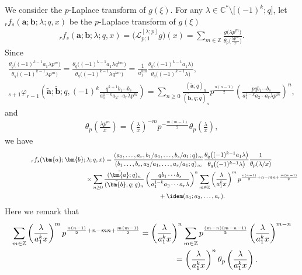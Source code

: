 We consider the $p$-Laplace transform of $g(\xi)$. For any $\lambda\in\mathbb{C}^*\setminus\big[(-1)^k;q\big]$, let ${}_rf_s(\bm{a};\bm{b};\lambda;q,x)$ be the $p$-Laplace transform of $g(\xi)$
\begin{gather*}
{}_rf_s(\bm{a};\bm{b};\lambda;q,x)=\big(\mathcal{L}_{p;1}^{[\lambda;p]}g\big)(x)=\sum_{m\in\mathbb{Z}}\frac{g\big(\lambda p^m\big)}{\theta_p\big(\frac{\lambda p^m}{x}\big)}.
\end{gather*}
Since
\begin{gather*}
\frac{\theta_q\big((-1)^{k-1}a_1\lambda p^m\big)}{\theta_q\big((-1)^{k-1}\lambda p^m\big)}=\frac{\theta_q\big((-1)^{k-1}a_1\lambda q^{km}\big)}{\theta_q\big((-1)^{k-1}\lambda q^{km}\big)}=\frac{1}{a_1^{km}}\frac{\theta_q\big((-1)^{k-1}a_1\lambda\big)}{\theta_q\big((-1)^{k-1}\lambda\big)},
\\
{}_{s+1}\varphi_{r-1}\left(\tilde{\bm{a}};\tilde{\bm{b}};q,(-1)^k\frac{q^{k+1}b_1\cdots b_s}{a_1^{1-k}a_2\cdots a_r\lambda p^m}\right)=\sum_{n\ge0}\frac{(\tilde{\bm{a}};q)_n}{(\tilde{\bm{b}},q;q)_n}p^{\frac{n(n-1)}{2}}\left(\frac{pqb_1\cdots b_s}{a_1^{1-k}a_2\cdots a_r\lambda p^m}\right)^n,
\end{gather*}
and
\begin{gather*}
\theta_p\left(\frac{\lambda p^m}{x}\right)=\left(\frac{\lambda}{x}\right)^{-m}p^{-\frac{m(m-1)}{2}}\theta_p\left(\frac{\lambda}{x}\right),
\end{gather*}
we have
\begin{gather*}
{}_rf_s(\bm{a};\bm{b};\lambda;q,x)= \frac{(a_2,\ldots,a_r,b_1/a_1,\ldots,b_{s}/a_1;q)_\infty}{(b_1\ldots,b_s,a_2/a_1,\ldots, a_r/a_1;q)_\infty}\frac{\theta_q\big((-1)^{k-1}a_1\lambda\big)}{\theta_q\big((-1)^{k-1}\lambda\big)}\frac{1}{\theta_p(\lambda/x)}\\
\hphantom{{}_rf_s(\bm{a};\bm{b};\lambda;q,x)=}{} \times\sum_{n\ge0}\frac{(\tilde{\bm{a}};q)_n}{(\tilde{\bm{b}},q;q)_n}\left(\frac{qb_1\cdots b_s}{a_1^{1-k}a_2\cdots a_r\lambda}\right)^n \sum_{m\in\mathbb{Z}}\left(\frac{\lambda}{a_1^kx}\right)^mp^{\frac{n(n-1)}{2}+n-mn+\frac{m(m-1)}{2}}\\
\hphantom{{}_rf_s(\bm{a};\bm{b};\lambda;q,x)=}{} +\idem(a_1;a_2,\ldots,a_r).
\end{gather*}
Here we remark that
\begin{gather*}
\sum_{m\in\mathbb{Z}}\left(\frac{\lambda}{a_1^kx}\right)^mp^{\frac{n(n-1)}{2}+n-mn+\frac{m(m-1)}{2}} =\left(\frac{\lambda}{a_1^kx}\right)^n\sum_{m\in\mathbb{Z}}p^{\frac{(m-n)(m-n-1)}{2}}\left(\frac{\lambda}{a_1^kx}\right)^{m-n}\\
\hphantom{\sum_{m\in\mathbb{Z}}\left(\frac{\lambda}{a_1^kx}\right)^mp^{\frac{n(n-1)}{2}+n-mn+\frac{m(m-1)}{2}} }{}
=\left(\frac{\lambda}{a_1^kx}\right)^n\theta_p\left(\frac{\lambda}{a_1^kx}\right).
\end{gather*}
